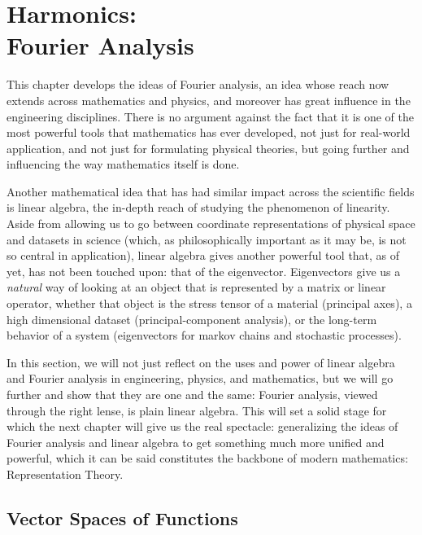 \chapter[Harmonics: Fourier Analysis]{Harmonics:\\ Fourier Analysis}

	This chapter develops the ideas of Fourier analysis, an idea whose reach now extends across mathematics and physics, and moreover has great influence in the engineering disciplines. There is no argument against the fact that it is one of the most powerful tools that mathematics has ever developed, not just for real-world application, and not just for formulating physical theories, but going further and influencing the way mathematics itself is done. 
	
	Another mathematical idea that has had similar impact across the scientific fields is linear algebra, the in-depth reach of studying the phenomenon of linearity. Aside from allowing us to go between coordinate representations of physical space and datasets in science (which, as philosophically important as it may be, is not so central in application), linear algebra gives another powerful tool that, as of yet, has not been touched upon: that of the eigenvector. Eigenvectors give us a \emph{natural} way of looking at an object that is represented by a matrix or linear operator, whether that object is the stress tensor of a material (principal axes), a high dimensional dataset (principal-component analysis), or the long-term behavior of a system (eigenvectors for markov chains and stochastic processes). 
	
	In this section, we will not just reflect on the uses and power of linear algebra and Fourier analysis in engineering, physics, and mathematics, but we will go further and show that they are one and the same: Fourier analysis, viewed through the right lense, is plain linear algebra. This will set a solid stage for which the next chapter will give us the real spectacle: generalizing the ideas of Fourier analysis and linear algebra to get something much more unified and powerful, which it can be said constitutes the backbone of modern mathematics: Representation Theory. 



\section{Vector Spaces of Functions} %
\label{sec:vector_spaces_of_functions}



